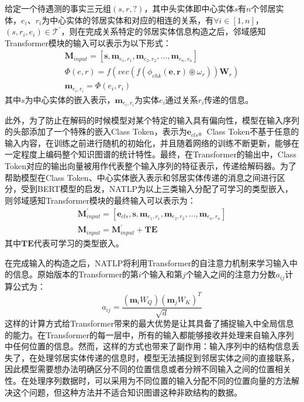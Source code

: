 给定一个待遇测的事实三元组$(s,r,?)$，其中头实体即中心实体$s$有$n$个邻居实体，$e_i$、$r_i$为中心实体的邻居实体和对应的相连的关系，有$\forall  i\in\left[1,n\right] $，$(s,r_i,e_i) \in \mathcal{T}^\prime $，则在完成关系特定的邻居实体信息构造之后，邻域感知Transformer模块的输入可以表示为以下形式：
\begin{gather}
  \mathbf{M}_{input}=\left[\boldsymbol{s},\boldsymbol{m}_{e_1,r_1},\boldsymbol{m}_{e_2,r_2},...,\boldsymbol{m}_{e_n,r_n}\right] \\
  \varPhi \left(e,r\right) = f\left(vec\left(f\left(\phi_{chk}\left(\boldsymbol{e},\boldsymbol{r}\right) \circledast \omega_{r} \right)\right)\mathbf{W}_{r}\right)\\
  \boldsymbol{m}_{e_i,r_i}=\varPhi \left(e_i,r_i\right)
\end{gather}
其中$s$为中心实体的嵌入表示，$\boldsymbol{m}_{e_i,r_i}$为实体$e_i$通过关系$r_i$传递的信息。

此外，为了防止在解码的时候模型对某个特定的输入具有偏向性，模型在输入序列的头部添加了一个特殊的嵌入Class Token，表示为$\boldsymbol{e}_{cls}$。Class Token不基于任意的输入内容，在训练之前进行随机的初始化，并且随着网络的训练不断更新，能够在一定程度上编码整个知识图谱的统计特性。最终，在Transformer的输出中，Class Token对应的输出向量被用作代表整个输入序列的特征表示，传递给解码器。为了帮助模型在Class Token、中心实体嵌入表示和邻居实体传递的消息之间进行区分，受到BERT模型的启发，NATLP为以上三类输入分配了可学习的类型嵌入，则邻域感知Transformer模块的最终输入可以表示为：
\begin{gather}
  \mathbf{M}_{input}^\prime = \left[\boldsymbol{e}_{cls},\boldsymbol{s},\boldsymbol{m}_{e_1,r_1},\boldsymbol{m}_{e_2,r_2},...,\boldsymbol{m}_{e_n,r_n}\right]\\
  \mathbf{M}_{input} = \mathbf{M}_{input}^\prime + \mathbf{TE}
\end{gather}
其中$\mathbf{TE}$代表可学习的类型嵌入。

在完成输入的构造之后，NATLP将利用Transformer的自注意力机制来学习输入中的信息。原始版本的Transformer的第$i$个输入和第$j$个输入之间的注意力分数$a_{ij}$计算公式为：
\begin{equation}
  \label{attention_score}
  a_{ij}=\frac{(\boldsymbol{m}_iW_Q)(\boldsymbol{m}_jW_K)^T}{\sqrt{d}}
\end{equation}
这样的计算方式给Transformer带来的最大优势是让其具备了捕捉输入中全局信息的能力。在Transformer的每一层中，所有的输入都能够接收并处理来自输入序列中任何位置的信息。然而，这样的方式也带来了副作用：输入序列中的结构信息丢失了，在处理邻居实体传递的信息时，模型无法捕捉到邻居实体之间的直接联系，因此模型需要想办法明确区分不同的位置信息或者分辨不同输入之间的位置相关性。在处理序列数据时，可以采用为不同位置的输入分配不同的位置向量的方法解决这个问题，但这种方法并不适合知识图谱这种非欧结构的数据。

